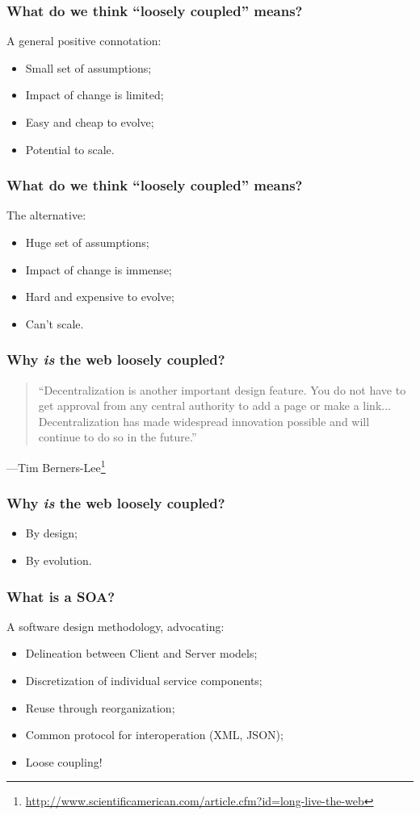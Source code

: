 \documentclass{beamer}
\begin{document}
\begin{frame}
    \frametitle{What do we think ``loosely coupled'' means?}
    A general positive connotation:
    \begin{itemize}
        \item{Small set of assumptions;}
        \item{Impact of change is limited;}
        \item{Easy and cheap to evolve;}
        \item{Potential to scale.}
    \end{itemize}
\end{frame}

\begin{frame}
    \frametitle{What do we think ``loosely coupled'' means?}
    The alternative:
    \begin{itemize}
        \item{Huge set of assumptions;}
        \item{Impact of change is immense;}
        \item{Hard and expensive to evolve;}
        \item{Can't scale.}
    \end{itemize}
\end{frame}

\begin{frame}
    \frametitle{Why \emph{is} the web loosely coupled?}
    \begin{quote}
        ``Decentralization is another important design feature. You do not have to get approval from any central authority to add a page or make a link... Decentralization has made widespread innovation possible and will continue to do so in the future.''
    \end{quote}
    \hfill ---Tim Berners-Lee\footnote{\scriptsize{\url{http://www.scientificamerican.com/article.cfm?id=long-live-the-web}}}
\end{frame}

\begin{frame}
    \frametitle{Why \emph{is} the web loosely coupled?}
    \begin{itemize}
        \item By design;
        \item By evolution.
    \end{itemize}
\end{frame}

\begin{frame}
    \frametitle{What is a SOA?}
    A software design methodology, advocating:
    \begin{itemize}
        \item Delineation between Client and Server models;
        \item Discretization of individual service components;
        \item Reuse through reorganization;
        \item Common protocol for interoperation (XML, JSON);
        \item Loose coupling!
    \end{itemize}
\end{frame}
\end{document}
